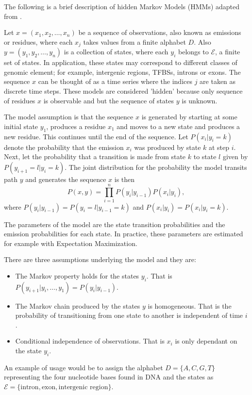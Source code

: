 The following is a brief description of hidden Markov Models (HMMs) adapted from \cite{mesa2016hidden}. 

Let $x = (x_1,x_2,\ldots,x_n)$ be a sequence of observations, also known as emissions or residues, where each $x_j$ takes values from a finite alphabet $D$. 
Also $y = (y_1,y_2,\ldots,y_n)$ is a collection of states, where each $y_i$ belongs to $\mathcal{E}$, a finite set of states. In application, these states may correspond to different classes of genomic element; for example, intergenic regions, TFBSs, introns or exons. The sequence $x$ can be thought of as a time series where the indices $j$ are taken as discrete time steps. These models are considered 'hidden' because only sequence of residues $x$ is observable and but the sequence of states $y$ is unknown.
 
The model assumption is that the sequence $x$ is generated by starting at some initial state $y_1$, produces a residue $x_1$ and moves to a new state and produces a new residue. This continues until the end of the sequence. Let $P(x_i|y_i = k)$ denote the probability that the emission $x_i$ was produced by state $k$ at step $i$. Next, let the probability that a transition is made from state $k$ to state $l$ given by $P(y_{i+1} = l | y_i = k)$. The joint distribution for the probability the model transits path $y$ and generates the sequence $x$ is then
	\begin{equation}
		P(x,y) = \prod_{i=1}^{n} P(y_i|y_{i-1})P(x_i|y_i),
	\end{equation}
where $P(y_i|y_{i-1}) = P(y_{i} = l | y_{i-1} = k)$ and $P(x_i|y_i) = P(x_i|y_i = k)$. 

The parameters of the model are the state transition probabilities and the emission probabilities for each state. In practice, these parameters are estimated for example with Expectation Maximization.

There are three assumptions underlying the model and they are:
	\begin{itemize}
		\item The Markov property holds for the states $y_i$. That is $P(y_{i+1}|y_i,\ldots,y_1) = P(y_i|y_{i-1})$.
		\item The Markov chain produced by the states $y$ is homogeneous. That is the probability of transitioning from one state to another is independent of time $i$. 
		\item Conditional independence of observations. That is $x_i$ is only dependant on the state $y_i$. 
	\end{itemize}

An example of usage would be to assign the alphabet $D = \{A,C,G,T\}$ representing the four nucleotide bases found in DNA and the states as $\mathcal{E} = \{\text{intron}, \text{exon}, \text{intergenic region}\}$. 






